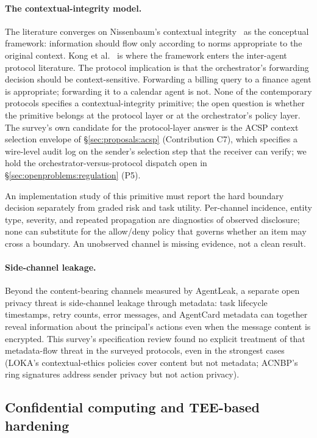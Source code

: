 \paragraph{The contextual-integrity model.}
The literature converges on Nissenbaum's contextual
integrity~\cite{nissenbaum2009privacy} as the conceptual
framework: information should flow only according to
norms appropriate to the original context. Kong et
al.~\cite{kong2025communication} is where the framework
enters the inter-agent protocol literature. The protocol
implication is that the orchestrator's
forwarding decision should be context-sensitive.
Forwarding a billing query to a finance agent is
appropriate; forwarding it to a calendar agent is not.
None of the contemporary protocols specifies a
contextual-integrity primitive; the open question is
whether the primitive belongs at the protocol layer or
at the orchestrator's policy layer. The survey's own
candidate for the protocol-layer answer is the ACSP
context selection envelope of \S\ref{sec:proposals:acsp}
(Contribution C7), which specifies a wire-level audit log
on the sender's selection step that the receiver can
verify; we hold the orchestrator-versus-protocol dispatch
open in \S\ref{sec:openproblems:regulation} (P5).

An implementation study of this primitive must report the
hard boundary decision separately from graded risk and
task utility. Per-channel incidence, entity type, severity,
and repeated propagation are diagnostics of observed
disclosure; none can substitute for the allow/deny policy
that governs whether an item may cross a boundary. An
unobserved channel is missing evidence, not a clean result.

\paragraph{Side-channel leakage.}
Beyond the content-bearing channels measured by AgentLeak,
a separate open privacy threat is side-channel leakage through
metadata: task lifecycle timestamps, retry counts, error
messages, and AgentCard metadata can together reveal
information about the principal's actions even when the
message content is encrypted. This survey's specification
review found no explicit treatment of that metadata-flow
threat in the surveyed protocols, even
in the strongest cases (LOKA's contextual-ethics
policies cover content but not metadata; ACNBP's
ring signatures address sender privacy but not action
privacy).

\subsection{Confidential computing and TEE-based hardening}
\label{sec:security:tee}

